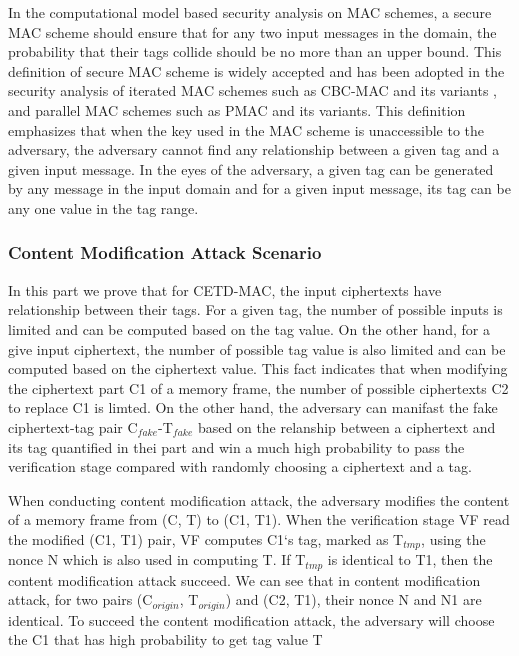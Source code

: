 In the computational model based security analysis on MAC schemes, a secure MAC scheme should ensure that for any two input messages in the domain, the probability that their tags collide should be no more than an upper bound. This definition of secure MAC scheme is widely accepted and has been adopted in the security analysis of iterated MAC schemes such as CBC-MAC \cite{} and its variants \cite{}, and parallel MAC schemes such as PMAC \cite{} and its variants\cite{}. This definition emphasizes that when the key used in the MAC scheme is unaccessible to the adversary, the adversary cannot find any relationship between a given tag and a given input message. In the eyes of the adversary, a given tag can be generated by any message in the input domain and for a given input message, its tag can be any one value in the tag range. 
\subsubsection{Content Modification Attack Scenario}
In this part we prove that for CETD-MAC, the input ciphertexts have relationship between their tags.  For a given tag, the number of possible inputs is limited and can be computed based on the tag value. On the other hand, for a give input ciphertext, the number of possible tag value is also limited and can be computed based on the ciphertext value. This fact indicates that when modifying the ciphertext part C1 of a memory frame, the number of possible ciphertexts C2 to replace C1 is limted. On the other hand, the adversary can manifast the fake ciphertext-tag pair C$_{fake}$-T$_{fake}$ based on the relanship between a ciphertext and its tag quantified in thei part and win a much high probability to pass the verification stage compared with randomly choosing a ciphertext and a tag. 

When conducting content modification attack, the adversary modifies the content of a memory frame from (C, T) to (C1, T1). When the verification stage VF read the modified (C1, T1) pair, VF computes C1`s tag, marked as T$_{tmp}$, using the nonce N which is also used in computing T. If T$_{tmp}$ is identical to T1, then the content modification attack succeed. We can see that in content modification attack, for two pairs (C$_{origin}$, T$_{origin}$) and (C2, T1), their nonce N and N1 are identical. To succeed the content modification attack, the adversary will choose the C1 that has high probability to get tag value T    
